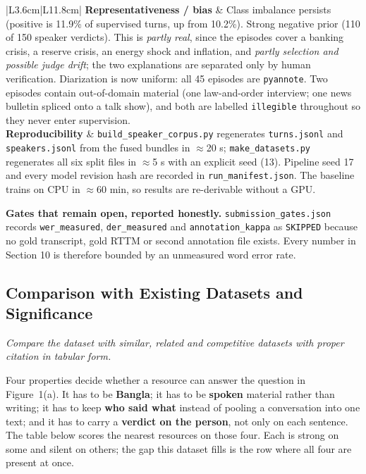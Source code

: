 \documentclass[11pt,a4paper]{article}
\newcommand{\thd}[1]{\textbf{\sffamily\small #1}}          %
\begin{document}
\begin{longtable}{|L{3.6cm}|L{11.8cm}|}
\thd{Representativeness / bias} & Class imbalance persists (positive is 11.9\% of supervised turns, up from 10.2\%). Strong negative prior (110 of 150 speaker verdicts). This is \emph{partly real}, since the episodes cover a banking crisis, a reserve crisis, an energy shock and inflation, and \emph{partly selection and possible judge drift}; the two explanations are separated only by human verification. Diarization is now uniform: all 45 episodes are \texttt{pyannote}. Two episodes contain out-of-domain material (one law-and-order interview; one news bulletin spliced onto a talk show), and both are labelled \texttt{illegible} throughout so they never enter supervision. \\ \hline
\thd{Reproducibility} & \texttt{build\_speaker\_corpus.py} regenerates \texttt{turns.jsonl} and \texttt{speakers.jsonl} from the fused bundles in $\approx$20 s; \texttt{make\_datasets.py} regenerates all six split files in $\approx$5 s with an explicit seed (13). Pipeline seed 17 and every model revision hash are recorded in \texttt{run\_manifest.json}. The baseline trains on CPU in $\approx$60 min, so results are re-derivable without a GPU. \\ \hline
\end{longtable}
\addtocounter{table}{-1}

\vspace{2pt}
\textbf{Gates that remain open, reported honestly.} \texttt{submission\_gates.json} records
\texttt{wer\_measured}, \texttt{der\_measured} and \texttt{annotation\_kappa} as
\texttt{SKIPPED} because no gold transcript, gold RTTM or second annotation file exists.
Every number in Section 10 is therefore bounded by an unmeasured word error rate.

\subsection{Comparison with Existing Datasets and Significance}

\emph{\small Compare the dataset with similar, related and competitive datasets with proper
citation in tabular form.}

\vspace{2pt}
Four properties decide whether a resource can answer the question in Figure~1(a). It has to be
\textbf{Bangla}; it has to be \textbf{spoken} material rather than writing; it has to keep
\textbf{who said what} instead of pooling a conversation into one text; and it has to carry a
\textbf{verdict on the person}, not only on each sentence. The table below scores the nearest resources
on those four. Each is strong on some and silent on others; the gap this dataset fills is the
row where all four are present at once.
\end{document}
